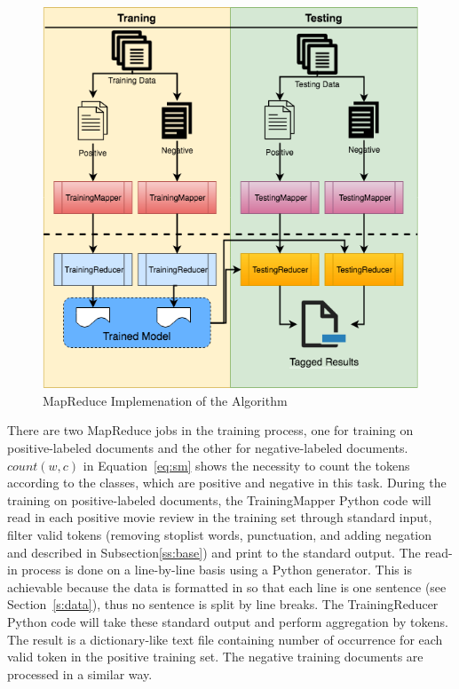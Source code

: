 \begin{figure}[!ht]
	\centering\includegraphics[width=\columnwidth]{images/mapreduce.png}
	\caption{MapReduce Implemenation of the Algorithm}\label{f:mapreduce}
\end{figure}

There are two MapReduce jobs in the training process, one for training
on positive-labeled documents and the other for negative-labeled
documents.  $count(w,c)$ in Equation~\ref{eq:sm} shows the necessity
to count the tokens according to the classes, which are positive and
negative in this task.  During the training on positive-labeled
documents, the TrainingMapper Python code will read in each positive
movie review in the training set through standard input, filter valid
tokens (removing stoplist words, punctuation, and adding negation and
described in Subsection\ref{ss:base}) and print to the standard
output. The read-in process is done on a line-by-line basis using a
Python generator. This is achievable because the data is formatted in
so that each line is one sentence (see Section~\ref{s:data}), thus no
sentence is split by line breaks. The TrainingReducer Python code will
take these standard output and perform aggregation by tokens. The
result is a dictionary-like text file containing number of occurrence
for each valid token in the positive training set. The negative
training documents are processed in a similar way.

